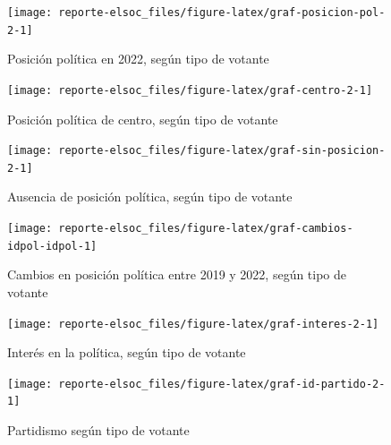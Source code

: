 \documentclass[
  12pt,
]{book}
\begin{document}
\begin{figure}

{\centering \texttt{[image: reporte-elsoc\_files/figure-latex/graf-posicion-pol-2-1]} 

}

\caption{Posición política en 2022, según tipo de votante}\label{fig:graf-posicion-pol-2}
\end{figure}

\begin{figure}

{\centering \texttt{[image: reporte-elsoc\_files/figure-latex/graf-centro-2-1]} 

}

\caption{Posición política de centro, según tipo de votante}\label{fig:graf-centro-2}
\end{figure}

\begin{figure}

{\centering \texttt{[image: reporte-elsoc\_files/figure-latex/graf-sin-posicion-2-1]} 

}

\caption{Ausencia de posición política, según tipo de votante}\label{fig:graf-sin-posicion-2}
\end{figure}

\begin{figure}

{\centering \texttt{[image: reporte-elsoc\_files/figure-latex/graf-cambios-idpol-idpol-1]} 

}

\caption{Cambios en posición política entre 2019 y 2022, según tipo de votante}\label{fig:graf-cambios-idpol-idpol}
\end{figure}

\begin{figure}

{\centering \texttt{[image: reporte-elsoc\_files/figure-latex/graf-interes-2-1]} 

}

\caption{Interés en la política, según tipo de votante}\label{fig:graf-interes-2}
\end{figure}

\begin{figure}

{\centering \texttt{[image: reporte-elsoc\_files/figure-latex/graf-id-partido-2-1]} 

}

\caption{Partidismo según tipo de votante}\label{fig:graf-id-partido-2}
\end{figure}
\end{document}
